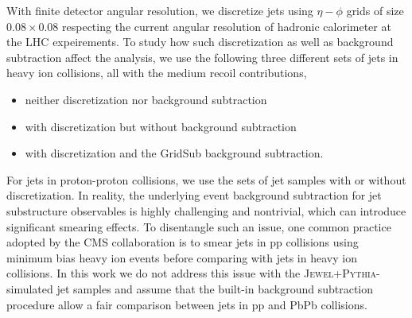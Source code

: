 \documentclass[notoc]{JHEP3}
\newcommand{\jw}{\textsc{Jewel}}
\newcommand{\jwpy}{\textsc{Jewel+Pythia}}
\begin{document}

With finite detector angular resolution, we discretize jets using $\eta-\phi$ grids of size $0.08 \times 0.08$ respecting the current angular resolution of hadronic calorimeter at the LHC expeirements. To study how such discretization as well as background subtraction affect the analysis, we use the following three different sets of jets in heavy ion collisions, all with the medium recoil contributions,
\begin{itemize}
    \item neither discretization nor background subtraction
	\item with discretization but without background subtraction
	\item with discretization and the GridSub background subtraction.
\end{itemize}
For jets in proton-proton collisions, we use the sets of jet samples with or without discretization. In reality, the underlying event background subtraction for jet substructure observables is highly challenging and nontrivial, which can introduce significant smearing effects. To disentangle such an issue, one common practice adopted by the CMS collaboration is to smear jets in pp collisions using minimum bias heavy ion events before comparing with jets in heavy ion collisions. In this work we do not address this issue with the \jwpy-simulated jet samples and assume that the built-in background subtraction procedure allow a fair comparison between jets in pp and PbPb collisions. 
\end{document}
